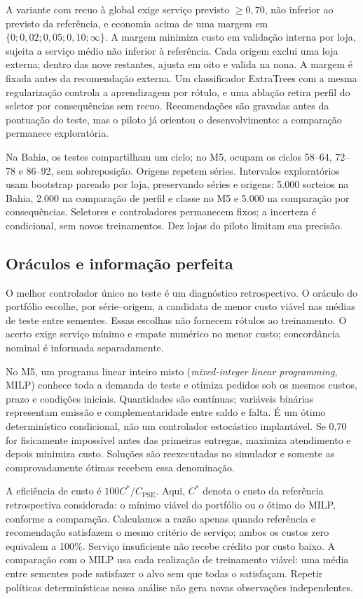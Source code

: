 \documentclass[preprint,12pt]{elsarticle}
\begin{document}
A variante com recuo à global exige serviço previsto $\geq0{,}70$, não inferior ao previsto da referência, e economia acima de uma margem em $\{0;0{,}02;0{,}05;0{,}10;\infty\}$. A margem minimiza custo em validação interna por loja, sujeita a serviço médio não inferior à referência. Cada origem exclui uma loja externa; dentro das nove restantes, ajusta em oito e valida na nona. A margem é fixada antes da recomendação externa. Um classificador ExtraTrees com a mesma regularização controla a aprendizagem por rótulo, e uma ablação retira perfil do seletor por consequências sem recuo. Recomendações são gravadas antes da pontuação do teste, mas o piloto já orientou o desenvolvimento: a comparação permanece exploratória.

Na Bahia, os testes compartilham um ciclo; no M5, ocupam os ciclos 58--64, 72--78 e 86--92, sem sobreposição. Origens repetem séries. Intervalos exploratórios usam bootstrap pareado por loja, preservando séries e origens: 5.000 sorteios na Bahia, 2.000 na comparação de perfil e classe no M5 e 5.000 na comparação por consequências. Seletores e controladores permanecem fixos; a incerteza é condicional, sem novos treinamentos. Dez lojas do piloto limitam sua precisão.

\subsection{Oráculos e informação perfeita}
O melhor controlador único no teste é um diagnóstico retrospectivo. O oráculo do portfólio escolhe, por série--origem, a candidata de menor custo viável nas médias de teste entre sementes. Essas escolhas não fornecem rótulos ao treinamento. O acerto exige serviço mínimo e empate numérico no menor custo; concordância nominal é informada separadamente.

No M5, um programa linear inteiro misto (\textit{mixed-integer linear programming}, MILP) conhece toda a demanda de teste e otimiza pedidos sob os mesmos custos, prazo e condições iniciais. Quantidades são contínuas; variáveis binárias representam emissão e complementaridade entre saldo e falta. É um ótimo determinístico condicional, não um controlador estocástico implantável. Se 0,70 for fisicamente impossível antes das primeiras entregas, maximiza atendimento e depois minimiza custo. Soluções são reexecutadas no simulador e somente as comprovadamente ótimas recebem essa denominação.

A eficiência de custo é $100C^*/C_{\mathrm{PSE}}$. Aqui, $C^*$ denota o custo da referência retrospectiva considerada: o mínimo viável do portfólio ou o ótimo do MILP, conforme a comparação. Calculamos a razão apenas quando referência e recomendação satisfazem o mesmo critério de serviço; ambos os custos zero equivalem a 100\%. Serviço insuficiente não recebe crédito por custo baixo. A comparação com o MILP usa cada realização de treinamento viável: uma média entre sementes pode satisfazer o alvo sem que todas o satisfaçam. Repetir políticas determinísticas nessa análise não gera novas observações independentes.
\end{document}
